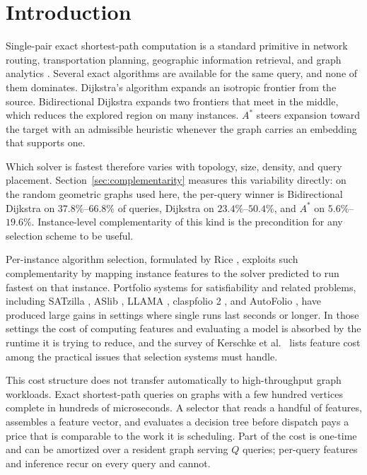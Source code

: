 \documentclass[conference]{IEEEtran}
\begin{document}
\section{Introduction}

Single-pair exact shortest-path computation is a standard primitive in network routing, transportation planning, geographic information retrieval, and graph analytics \cite{dijkstra1959, bast2016}. Several exact algorithms are available for the same query, and none of them dominates. Dijkstra's algorithm \cite{dijkstra1959} expands an isotropic frontier from the source. Bidirectional Dijkstra \cite{nicholson1966, pohl1971} expands two frontiers that meet in the middle, which reduces the explored region on many instances. $A^*$ \cite{hart1968} steers expansion toward the target with an admissible heuristic whenever the graph carries an embedding that supports one.

Which solver is fastest therefore varies with topology, size, density, and query placement. Section~\ref{sec:complementarity} measures this variability directly: on the random geometric graphs used here, the per-query winner is Bidirectional Dijkstra on $37.8\%$--$66.8\%$ of queries, Dijkstra on $23.4\%$--$50.4\%$, and $A^*$ on $5.6\%$--$19.6\%$. Instance-level complementarity of this kind is the precondition for any selection scheme to be useful.

Per-instance algorithm selection, formulated by Rice \cite{rice1976}, exploits such complementarity by mapping instance features to the solver predicted to run fastest on that instance. Portfolio systems for satisfiability and related problems, including SATzilla \cite{xu2008}, ASlib \cite{bischl2016}, LLAMA \cite{kotthoff2014}, claspfolio 2 \cite{gebser2014}, and AutoFolio \cite{lindauer2015}, have produced large gains in settings where single runs last seconds or longer. In those settings the cost of computing features and evaluating a model is absorbed by the runtime it is trying to reduce, and the survey of Kerschke et al.\ \cite{kerschke2019} lists feature cost among the practical issues that selection systems must handle.

This cost structure does not transfer automatically to high-throughput graph workloads. Exact shortest-path queries on graphs with a few hundred vertices complete in hundreds of microseconds. A selector that reads a handful of features, assembles a feature vector, and evaluates a decision tree before dispatch pays a price that is comparable to the work it is scheduling. Part of the cost is one-time and can be amortized over a resident graph serving $Q$ queries; per-query features and inference recur on every query and cannot.
\end{document}
